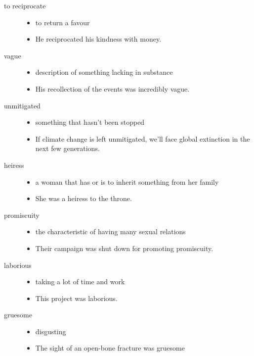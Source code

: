 \documentclass[a4paper]{article}
\begin{document}
\begin{description}
\begin{itemize}
    \end{itemize}
    \item[to reciprocate] \begin{itemize}
        \item to return a favour
        \item He reciprocated his kindness with money.
    \end{itemize}
    \item[vague] \begin{itemize}
        \item description of something lacking in substance
        \item His recollection of the events was incredibly vague.
    \end{itemize}
    \item[unmitigated] \begin{itemize}
        \item something that hasn't been stopped
        \item If climate change is left unmitigated, we'll face global extinction in the next few generations.
    \end{itemize}
    \item[heiress] \begin{itemize}
        \item a woman that has or is to inherit something from her family
        \item She was a heiress to the throne.
    \end{itemize}
    \item[promiscuity] \begin{itemize}
        \item the characteristic of having many sexual relations
        \item Their campaign was shut down for promoting promiscuity.
    \end{itemize}
    \item[laborious] \begin{itemize}
        \item taking a lot of time and work
        \item This project was laborious.
    \end{itemize}
    \item[gruesome] \begin{itemize}
        \item disgusting
        \item The sight of an open-bone fracture was gruesome
    \end{itemize}

\end{description}
\end{document}
